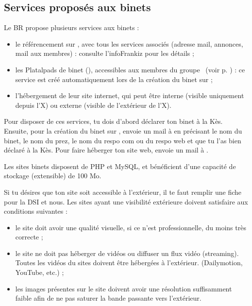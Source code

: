 \subsection{Services proposés aux binets}

Le BR propose plusieurs services aux binets :
\begin{itemize}
\item le référencement sur \fkz, avec tous les services associés (adresse mail, annonces, mail aux membres) : consulte l'infoFrankiz pour les détails ;
\item les Platalpads de binet (), accessibles aux membres du groupe \fkz\ (voir p. \pageref{platalpad}) : ce service est créé automatiquement lors de la création du binet sur \fkz ;
\item l'hébergement de leur site internet, qui peut être interne (visible uniquement depuis l'X) ou externe (visible de l'extérieur de l'X).\\
\end{itemize}

Pour disposer de ces services, tu dois d'abord déclarer ton binet à la Kès. Ensuite, pour la création du binet sur \fkz, envoie un mail à  en précisant le nom du binet, le nom du prez, le nom du respo com ou du respo web et que tu l'as bien déclaré à la Kès. Pour faire héberger ton site web, envoie un mail à .

\vspace{4mm}

Les sites binets disposent de PHP et MySQL, et bénéficient d'une capacité de stockage (extensible) de 100 Mo.

Si tu désires que ton site soit accessible à l'extérieur, il te faut remplir une fiche pour la DSI et nous. Les sites ayant une visibilité extérieure doivent satisfaire aux conditions suivantes :
\begin{itemize}
    \item le site doit avoir une qualité visuelle, si ce n'est professionnelle, du moins très correcte ;
    \item le site ne doit pas héberger de vidéos ou diffuser un flux vidéo (streaming). Toutes les vidéos du sites doivent être hébergées à l'extérieur. (Dailymotion, YouTube, etc.) ;
    \item les images présentes sur le site doivent avoir une résolution suffisamment faible afin de ne pas saturer la bande passante vers l'extérieur. 
\end{itemize}

